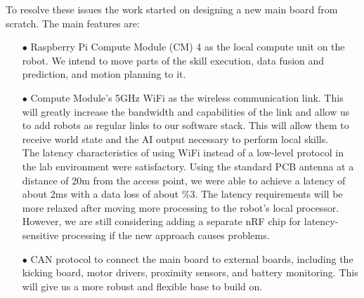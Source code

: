 \documentclass[runningheads]{llncs}
\begin{document}
To resolve these issues the work started on designing a new main board from scratch. The main features are:
\begin{enumerate}
    \item[$\bullet$] Raspberry Pi Compute Module (CM) 4 as the local compute unit on the robot. We intend to move parts of the skill execution, data fusion and prediction, and motion planning to it.
    \item[$\bullet$] Compute Module's 5GHz WiFi as the wireless communication link. This will greatly increase the bandwidth and capabilities of the link and allow us to add robots as regular links to our software stack. This will allow them to receive world state and the AI output necessary to perform local skills.\\
    The latency characteristics of using WiFi instead of a low-level protocol in the lab environment were satisfactory. Using the standard PCB antenna at a distance of 20m from the access point, we were able to achieve a latency of about 2ms with a data loss of about \%3. The latency requirements will be more relaxed after moving more processing to the robot's local processor. However, we are still considering adding a separate nRF chip for latency-sensitive processing if the new approach causes problems.
    \item[$\bullet$] CAN protocol to connect the main board to external boards, including the kicking board, motor drivers, proximity sensors, and battery monitoring. This will give us a more robust and flexible base to build on.
\end{enumerate}
\end{document}
